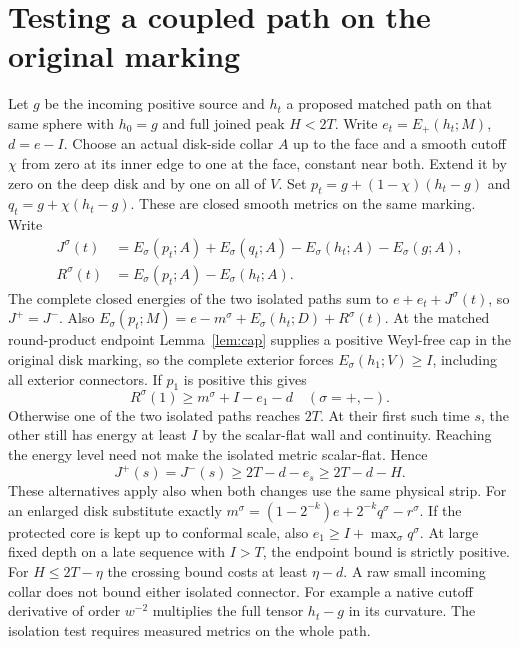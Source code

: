 \documentclass[11pt,letterpaper]{article}
\numberwithin{equation}{section}
\begin{document}
\section{Testing a coupled path on the original marking}\label{sec:isolate}
Let \(g\) be the incoming positive source and \(h_t\) a proposed
matched path on that same sphere with \(h_0=g\) and full joined peak
\(H<2T\). Write \(e_t=E_+(h_t;M)\), \(d=e-I\). Choose an actual
disk-side collar \(A\) up to the face and a smooth cutoff \(\chi\)
from zero at its inner edge to one at the face, constant near both.
Extend it by zero on the deep disk and by one on all of \(V\).
Set \(p_t=g+(1-\chi)(h_t-g)\) and \(q_t=g+\chi(h_t-g)\).
These are closed smooth metrics on the same marking. Write
\[
 \begin{split}
 J^\sigma(t)&=E_\sigma(p_t;A)+E_\sigma(q_t;A)
                    -E_\sigma(h_t;A)-E_\sigma(g;A),\\
 R^\sigma(t)&=E_\sigma(p_t;A)-E_\sigma(h_t;A).
 \end{split}
\]
The complete closed energies of the two isolated paths sum to
\(e+e_t+J^\sigma(t)\), so \(J^+=J^-\). Also
\(E_\sigma(p_t;M)=e-m^\sigma+E_\sigma(h_t;D)+R^\sigma(t)\).
At the matched round-product endpoint Lemma~\ref{lem:cap} supplies
a positive Weyl-free cap in the original disk marking, so the complete
exterior forces
\(E_\sigma(h_1;V)\ge I\), including all exterior connectors.
If \(p_1\) is positive this gives
\[
 R^\sigma(1)\ge m^\sigma+I-e_1-d\quad(\sigma=+,-).
\]
Otherwise one of the two isolated paths reaches \(2T\). At their
first such time \(s\), the other still has energy at least \(I\)
by the scalar-flat wall and continuity. Reaching the energy level
need not make the isolated metric scalar-flat. Hence
\[
 J^+(s)=J^-(s)\ge2T-d-e_s\ge2T-d-H.
\]
These alternatives apply also when both changes use the same
physical strip. For an enlarged disk substitute exactly
\(m^\sigma=(1-2^{-k})e+2^{-k}q^\sigma-r^\sigma\).
If the protected core is kept up to conformal scale, also
\(e_1\ge I+\max_\sigma q^\sigma\).
At large fixed depth on a late sequence with \(I>T\), the
endpoint bound is strictly positive. For \(H\le2T-\eta\)
the crossing bound costs at least \(\eta-d\).
A raw small incoming collar does not bound either isolated
connector. For example a native cutoff derivative of order
\(w^{-2}\) multiplies the full tensor \(h_t-g\) in its curvature.
The isolation test requires measured metrics on the whole path.
\end{document}
